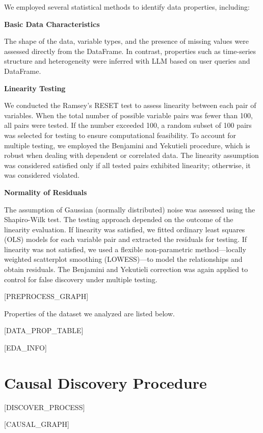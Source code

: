\documentclass{ctexart}
\begin{document}
We employed several statistical methods to identify data properties, including:

\textbf{Basic Data Characteristics}

The shape of the data, variable types, and the presence of missing values were assessed directly from the DataFrame. 
In contrast, properties such as time-series structure and heterogeneity were inferred with LLM based on user queries and DataFrame.

\textbf{Linearity Testing}

We conducted the Ramsey's RESET test to assess linearity between each pair of variables. When the total number of possible variable pairs was fewer than 100, all pairs were tested. If the number exceeded 100, a random subset of 100 pairs was selected for testing to ensure computational feasibility. 
To account for multiple testing, we employed the Benjamini and Yekutieli procedure, which is robust when dealing with dependent or correlated data. 
The linearity assumption was considered satisfied only if all tested pairs exhibited linearity; otherwise, it was considered violated.

\textbf{Normality of Residuals}

The assumption of Gaussian (normally distributed) noise was assessed using the Shapiro-Wilk test. 
The testing approach depended on the outcome of the linearity evaluation. 
If linearity was satisfied, we fitted ordinary least squares (OLS) models for each variable pair and extracted the residuals for testing. 
If linearity was not satisfied, we used a flexible non-parametric method—locally weighted scatterplot smoothing (LOWESS)—to model the relationships and obtain residuals. 
The Benjamini and Yekutieli correction was again applied to control for false discovery under multiple testing.


[PREPROCESS_GRAPH]

Properties of the dataset we analyzed are listed below.

\begin{table}[H]
    \centering
    \caption{Data Properties.}
[DATA_PROP_TABLE]
\end{table}

[EDA_INFO]

\section{Causal Discovery Procedure}
[DISCOVER_PROCESS]

[CAUSAL_GRAPH]
\end{document}
